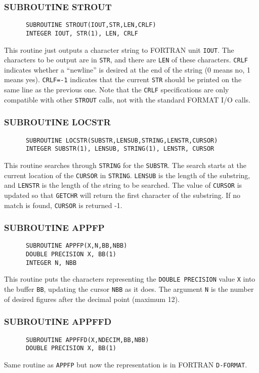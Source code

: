 \subsubsection{\sf SUBROUTINE STROUT}
\begin{verbatim}
      SUBROUTINE STROUT(IOUT,STR,LEN,CRLF)
      INTEGER IOUT, STR(1), LEN, CRLF
\end{verbatim}
This routine just outputs a character string to FORTRAN unit {\tt IOUT}.
The characters to be output are in {\tt STR}, and there are {\tt LEN} of these
characters.  {\tt CRLF} indicates whether a ``newline'' 
is desired at the end
of the string (0 means no, 1 means yes).  {\tt CRLF=-1} 
indicates that the current
{\tt STR} should be printed on the same line as the previous one. Note that
the {\tt CRLF} specifications are only compatible with other {\tt STROUT} 
calls,
not with the standard FORMAT I/O calls.
\subsubsection{\sf SUBROUTINE LOCSTR}
\begin{verbatim}
      SUBROUTINE LOCSTR(SUBSTR,LENSUB,STRING,LENSTR,CURSOR)
      INTEGER SUBSTR(1), LENSUB, STRING(1), LENSTR, CURSOR
\end{verbatim}
This routine searches through {\tt STRING} for the {\tt SUBSTR}. 
The search starts
at the current location of the {\tt CURSOR} in {\tt STRING}. 
{\tt LENSUB} is the length
of the substring, and {\tt LENSTR} is the length of the string to be
searched. The value of {\tt CURSOR} is updated so that  {\tt GETCHR} 
will return
the first character of the substring. If no match is found, {\tt CURSOR} is
returned -1.
\subsubsection{\sf SUBROUTINE APPFP}
\begin{verbatim}
      SUBROUTINE APPFP(X,N,BB,NBB)
      DOUBLE PRECISION X, BB(1)
      INTEGER N, NBB
\end{verbatim}
This routine puts the characters representing the {\tt DOUBLE PRECISION}
value {\tt X} into the buffer {\tt BB}, updating the cursor {\tt NBB} 
as it does. The
argument {\tt N} is the number of desired figures after the decimal point
(maximum 12).
\subsubsection{\sf SUBROUTINE APPFFD}
\begin{verbatim}
      SUBROUTINE APPFFD(X,NDECIM,BB,NBB)
      DOUBLE PRECISION X, BB(1)
\end{verbatim}
Same routine as {\tt APPFP} but now the representation is in FORTRAN
{\tt D-FORMAT}.
